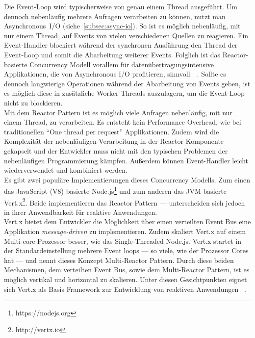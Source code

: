 Die Event-Loop wird typischerweise von genau einem Thread ausgeführt. Um dennoch nebenläufig mehrere Anfragen verarbeiten zu können, nutzt man Asynchronous~I/O (siehe~\ref{subsec:async-io}). So ist es möglich nebenläufig, mit nur einem Thread, auf Events von vielen verschiedenen Quellen zu reagieren. Ein Event-Handler blockiert während der synchronen Ausführung den Thread der Event-Loop und somit die Abarbeitung weiterer Events. Folglich ist das Reactor-basierte Concurrency Modell vorallem für datenübertragungsintensive Applikationen, die von Asynchronous I/O profitieren, sinnvoll~\cite[S.~73]{kuhn_reactive_2015}~\cite[S.~92]{erb_concurrent_2012}. Sollte es dennoch langwierige Operationen während der Abarbeitung von Events geben, ist es möglich diese in zusätzliche Worker-Threads auszulagern, um die Event-Loop nicht zu blockieren.\\
Mit dem Reactor Pattern ist es möglich viele Anfragen nebenläufig, mit nur einem Thread, zu verarbeiten. Es entsteht kein Performance Overhead, wie bei traditionellen \enquote{One thread per request} Applikationen. Zudem wird die Komplexität der nebenläufigen Verarbeitung in der Reactor Komponente gekapselt und der Entwickler muss nicht mit den typischen Problemen der nebenläufigen Programmierung kämpfen. Außerdem können Event-Handler leicht wiederverwendet und kombiniert werden.\\
Es gibt zwei populäre Implementierungen dieses Concurrency Modells. Zum einen das JavaScript (V8) basierte Node.js\footnote{https://nodejs.org} und zum anderen das JVM basierte Vert.x\footnote{http://vertx.io}. Beide implementieren das Reactor Pattern --- unterscheiden sich jedoch in ihrer Anwendbarkeit für reaktive Anwendungen.\\
Vert.x bietet dem Entwickler die Möglichkeit über einen verteilten Event Bus eine Applikation \textit{message-driven} zu implementieren. Zudem skaliert Vert.x auf einem Multi-core Prozessor besser, wie das Single-Threaded Node.js. Vert.x startet in der Standardeinstellung mehrere Event loops --- so viele, wie der Prozessor Cores hat --- und nennt dieses Konzept Multi-Reactor Pattern. Durch diese beiden Mechanismen, dem verteilten Event Bus, sowie dem Multi-Reactor Pattern, ist es möglich vertikal und horizontal zu skalieren. Unter diesen Gesichtpunkten eignet sich Vert.x als Basis Framework zur Entwicklung von reaktiven Anwendungen~\cite[S.~74]{kuhn_reactive_2015} \cite[S.~93~\&~S.~94]{erb_concurrent_2012}.

\pagebreak

